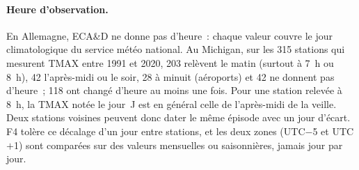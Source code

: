 \paragraph{Heure d'observation.}
En Allemagne, ECA\&D ne donne pas d'heure~: chaque valeur couvre le jour climatologique du service météo national. Au Michigan, sur les 315 stations qui mesurent TMAX entre 1991 et 2020, 203 relèvent le matin (surtout à 7~h ou 8~h), 42 l'après-midi ou le soir, 28 à minuit (aéroports) et 42 ne donnent pas d'heure~; 118 ont changé d'heure au moins une fois. Pour une station relevée à 8~h, la TMAX notée le jour~J est en général celle de l'après-midi de la veille. Deux stations voisines peuvent donc dater le même épisode avec un jour d'écart. F4 tolère ce décalage d'un jour entre stations, et les deux zones (UTC$-$5 et UTC$+$1) sont comparées sur des valeurs mensuelles ou saisonnières, jamais jour par jour.
